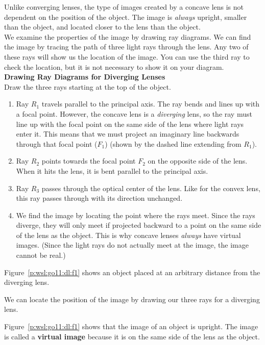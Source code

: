 Unlike converging lenses, the type of images created by a concave lens is not dependent on the position of the object. The image is \textit{always} upright, smaller than the object, and located closer to the lens than the object.\\

We examine the properties of the image by drawing ray diagrams. We can find the image by tracing the path of three light rays through the lens. Any two of these rays will show us the location of the image. You can use the third ray to check the location, but it is not necessary to show it on your diagram.\\

\newpage
\textbf{Drawing Ray Diagrams for Diverging Lenses}\\
Draw the three rays starting at the top of the object.
\begin{enumerate}
\item Ray $R_{1}$ travels parallel to the principal axis. The ray bends and lines up with a focal point. However, the concave lens is a \textit{diverging} lens, so the ray must line up with the focal point on the same side of the lens where light rays enter it. This means that we must project an imaginary line backwards through that focal point ($F_{1}$) (shown by the dashed line extending from $R_{1}$).
\item Ray $R_{2}$ points towards the focal point $F_{2}$ on the opposite side of the lens. When it hits the lens, it is bent parallel to the principal axis.
\item Ray $R_{3}$ passes through the optical center of the lens. Like for the convex lens, this ray passes through with its direction unchanged.
\item We find the image by locating the point where the rays meet. Since the rays diverge, they will only meet if projected backward to a point on the same side of the lens as the object. This is why concave lenses \textit{always} have virtual images. (Since the light rays do not actually meet at the image, the image cannot be real.)
\end{enumerate}

Figure~\ref{p:wsl:go11:dl:f1} shows an object placed at an arbitrary distance from the diverging lens.

We can locate the position of the image by drawing our three rays for a diverging lens.

Figure~\ref{p:wsl:go11:dl:f1} shows that the image of an object is upright. The image is called a \textbf{virtual image} because it is on the same side of the lens as the object.

